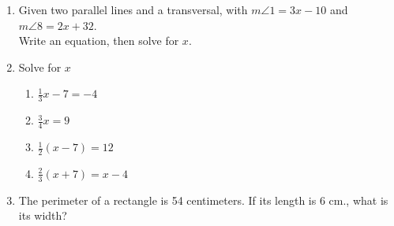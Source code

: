 \documentclass[12pt, twoside]{article}
\begin{document}
\begin{enumerate}
\newpage
  \item Given two parallel lines and a transversal, with $m\angle 1 = 3x-10$ and $m\angle 8 = 2x + 32$. \\ Write an equation, then solve for $x$.
\begin{flushright}
\end{flushright} \vspace{1cm}

\item Solve for $x$
  \begin{multicols}{2}
    \begin{enumerate}[itemsep=4cm]
      \item $\frac{1}{3} x-7=-4$
      \item $\frac{3}{4}x =9$
      \item $\frac{1}{2}(x-7)=12$
      \item $\frac{2}{3}(x+7)=x-4$
    \end{enumerate}
  \end{multicols} \vspace{4cm}

  \item The perimeter of a rectangle is 54 centimeters. If its length is 6 cm., what is its width?

\end{enumerate}
\end{document}
